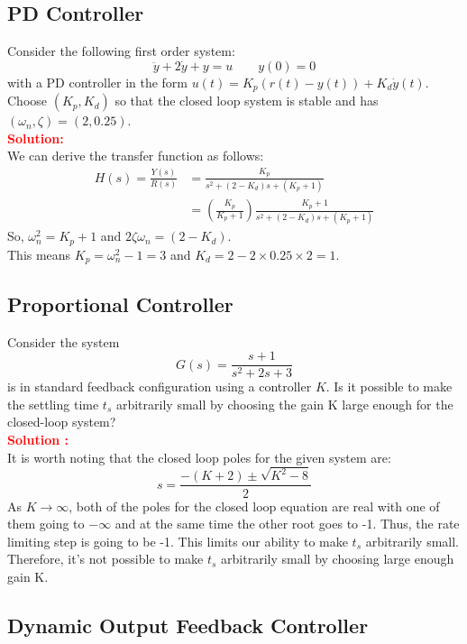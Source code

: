 \documentclass[12pt]{article}
\begin{document}
\subsection{PD Controller}

Consider the following first order system:
\[
\ddot{y} +2\dot{y} +y = u \qquad  y(0) = 0
\]
with a PD controller in the form $u(t) = K_p(r(t) - y(t)) + K_d \dot{y}(t)$.
Choose $(K_p, K_d)$ so that the closed loop system is stable and has $(\omega_n, \zeta) = (2, 0.25)$. \\
\noindent \textbf{\textcolor{red}{Solution:}} \\
We can derive the transfer function as follows:
\begin{equation*}
\begin{split}
H(s) =\frac{Y (s)}{R(s)} &= \frac{K_p}{s^2 + (2 - K_d )s + (K_p + 1)} \\
&= \left( \frac{K_p}{K_p+1}\right)
    \frac{K_p + 1}{s^2 + (2-K_d)s + (K_p + 1)}
\end{split}
\end{equation*}
So, $\omega^2_n = K_p + 1$ and $2\zeta \omega_n = (2-K_d)$. \\
This means $K_p = \omega^2_n - 1 = 3$ and $K_d = 2-2 \times 0.25 \times 2 = 1$.
\clearpage

\subsection{Proportional Controller}
Consider the system 
\[
G(s)=\frac{s + 1}{s^2 + 2s + 3}
\]
is in standard feedback configuration using a controller $K$. Is it possible to make the settling time $t_s$ arbitrarily small by choosing the gain K large enough for the closed-loop system? \\
\textbf{\textcolor{red}{Solution :}} \\
It is worth noting that the closed loop poles for the given system are:
\[
s =\frac{-(K + 2) \pm \sqrt{K^2 - 8}}{2}
\]
As $K \rightarrow \infty$, both of the poles for the closed loop equation are real with one of them going to $-\infty$ and at the same time the other root goes to -1. Thus, the rate limiting step is going to be -1. This limits our ability to make $t_s$ arbitrarily small. Therefore, it's not possible to make $t_s$ arbitrarily small by choosing large enough gain K.
\clearpage

\subsection{ Dynamic Output Feedback Controller}
\end{document}
